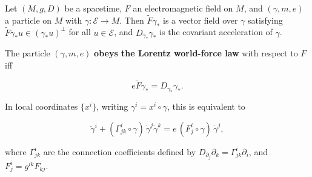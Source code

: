 Let $(M, g, D)$ be a spacetime, $F$ an electromagnetic field on $M$, and $(\gamma, m, e)$ a particle on $M$ with $\gamma: \mathcal{E} \rightarrow M$. Then $\tilde{F}\gamma_*$ is a vector field over $\gamma$ satisfying $\tilde{F}\gamma_*u \in (\gamma_*u)^\perp$ for all $u \in \mathcal{E}$, and $D_{\gamma_*}\gamma_*$ is the covariant acceleration of $\gamma$.

The particle $(\gamma, m, e)$ \textbf{obeys the Lorentz world-force law} with respect to $F$ iff

$$e\tilde{F}\gamma_* = D_{\gamma_*}\gamma_*.$$

In local coordinates $\{x^i\}$, writing $\gamma^i = x^i \circ \gamma$, this is equivalent to

$$\ddot{\gamma}^i + (\Gamma^i_{jk} \circ \gamma)\,\dot{\gamma}^j \dot{\gamma}^k = e\,(F^i_j \circ \gamma)\,\dot{\gamma}^j,$$

where $\Gamma^i_{jk}$ are the connection coefficients defined by $D_{\partial_j}\partial_k = \Gamma^i_{jk}\partial_i$, and $F^i_j = g^{ik}F_{kj}$.
